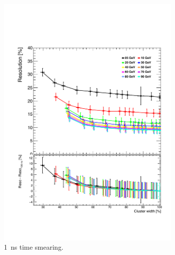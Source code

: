 \begin{figure}[t]
\begin{minipage}{1\textwidth}
\begin{subfigure}[t]{0.5\textwidth}
      \includegraphics[width=1\linewidth]{chap6/fig_TimingILD/1ns_Smearing/ShowerWidth_Resolution_Smearing1ns}
      \vspace{-6ex}
      \caption{\SI{1}{\nano\second} time smearing.} \label{fig:WidthReso1ns}
    \end{subfigure}
  \end{minipage}
  \begin{subfigure}[t]{0.5\textwidth}
    \centering

\end{subfigure}
\end{figure}
